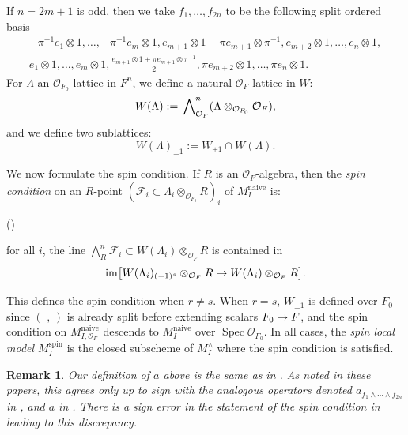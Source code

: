 \documentclass[pdflatex,sn-mathphys-num]{sn-jnl}%
\makeatletter
\theoremstyle{thmstyleone}%
\theoremstyle{thmstyletwo}%
\newtheorem{remark}[subsubsection]{Remark}%
\numberwithin{equation}{subsection}
\theoremstyle{thmstylethree}%
\newcommand{\sF}{\ensuremath{\mathscr{F}}\xspace}
\newcommand{\CO}{\ensuremath{\mathcal{O}}\xspace}
\DeclareMathOperator{\im}{im}
\newcommand{\naive}{\ensuremath{\mathrm{naive}}\xspace}
\DeclareMathOperator{\Spec}{Spec}
\newcommand{\spin}{\ensuremath{\mathrm{spin}}\xspace}
\newcommand{\sform}{\ensuremath{(\text{~,~})}\xspace}
\newenvironment{altenumerate}
	{\begin{list}
			{(\theenumi) }
			{\usecounter{enumi}
				\setlength{\labelwidth}{0pt}
				\setlength{\labelsep}{0pt}
				\setlength{\leftmargin}{0pt}
				\setlength{\itemsep}{\the\smallskipamount}
				\renewcommand{\theenumi}{\roman{enumi}}
		}}
		{\end{list}}
\renewcommand{\to}{%
		\ifbool{@display}{\longrightarrow}{\rightarrow}%
	}
\makeatother
\begin{document}
If $n = 2m+1$ is odd, then we take $f_1,\dotsc,f_{2n}$ to be the following split ordered basis
\begin{equation}\label{moduli_PR:odd-basis}
	\begin{gathered}
		-\pi^{-1} e_1 \otimes 1, \dotsc, -\pi^{-1} e_m \otimes 1, e_{m+1}\otimes 1 - \pi e_{m+1} \otimes \pi^{-1}, e_{m+2} \otimes 1,\dotsc, e_n\otimes 1, \\
		e_1\otimes 1,\dotsc, e_m \otimes 1, \frac{e_{m+1} \otimes 1 + \pi e_{m+1} \otimes \pi^{-1}}2, \pi e_{m+2} \otimes 1, \dotsc, \pi e_{n} \otimes 1.
	\end{gathered}
\end{equation}
For $\Lambda$ an $\CO_{F_0}$-lattice in $F^n$, we define a natural $\CO_F$-lattice in $W$:
\begin{equation}\label{moduli_PR:lattice-in-W}
	W(\Lambda) := \sideset{}{_{\CO_F}^n}\bigwedge (\Lambda \otimes_{\CO_{F_0}} \CO_F),
\end{equation}
and we define two sublattices:
\begin{equation*}
    W(\Lambda)_{\pm 1} := W_{\pm 1} \cap W(\Lambda).
\end{equation*}
		
		
We now formulate the spin condition.  If $R$ is an $\CO_F$-algebra, then the \emph{spin condition} on an $R$-point $(\sF_i \subset \Lambda_i \otimes_{\CO_{F_0}}R )_i$ of $M_I^\naive$ is:
\begin{altenumerate}
	\item[\fontfamily{cmtt}\selectfont LM7.] \label{moduli_PR:spin}
	    for all $i$, the line $\bigwedge_R^n \sF_i \subset W(\Lambda_i) \otimes_{\CO_{F}}R$ is contained in
        \begin{equation*}
            \im\bigl[ W(\Lambda_i)_{(-1)^s} \otimes_{\CO_{F}} R 
			\to W (\Lambda_i) \otimes_{\CO_{F}}R
			\bigr].
        \end{equation*}
\end{altenumerate}
This defines the spin condition when $r \neq s$.  When $r = s$, $W_{\pm 1}$ is defined over $F_0$ since \sform is already split before extending scalars $F_0 \to F$, and the spin condition on $M_{I,\CO_F}^\naive$ descends to $M_I^\naive$ over $\Spec \CO_{F_0}$.  In all cases, the \emph{spin local model $M_I^\spin$} is the closed subscheme of $M_I^\wedge$ where the spin condition is satisfied.
\begin{remark}
	Our definition of $a$ above is the same as in \cite{Smithling2011, Smithling2014}.  
	As noted in these papers, this agrees only up to sign with the analogous operators denoted $a_{f_1\wedge \dotsb \wedge f_{2n}}$ in \cite[Display 7.6]{PR2009}, and $a$ in \cite[\S 2.3]{Smithling2011}. There is a sign error in the statement of the spin condition in \cite[\S 7.2.1]{PR2009} leading to this discrepancy.
\end{remark}
		
\end{document}
